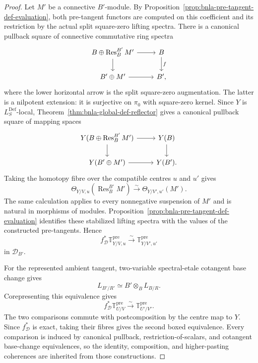 \begin{proof}
Let $M'$ be a connective $B'$-module.  By
Proposition~\ref{prop:bnla-pre-tangent-def-evaluation}, both pre-tangent
functors are computed on this coefficient and its restriction by the actual
split square-zero lifting spectra.  There is a canonical pullback square of
connective commutative ring spectra
\[
\begin{tikzcd}
B\oplus\operatorname{Res}^{B'}_BM'
  \arrow[r] \arrow[d] &
B \arrow[d,"f"]\\
B'\oplus M' \arrow[r] &
B',
\end{tikzcd}
\]
where the lower horizontal arrow is the split square-zero augmentation.  The
latter is a nilpotent extension: it is surjective on $\pi_0$ with square-zero
kernel.  Since $Y$ is $L^{\mathrm{Def}}_S$-local,
Theorem~\ref{thm:bnla-global-def-reflector} gives a canonical pullback square
of mapping spaces
\[
\begin{tikzcd}
Y(B\oplus\operatorname{Res}^{B'}_BM')
  \arrow[r] \arrow[d] &
Y(B) \arrow[d]\\
Y(B'\oplus M') \arrow[r] &
Y(B').
\end{tikzcd}
\]
Taking the homotopy fibre over the compatible centres $u$ and $u'$ gives
\[
\boxed{
    \Theta_{Y/V,u}
    \left(\operatorname{Res}^{B'}_BM'\right)
    \xrightarrow{\sim}
    \Theta_{Y/V',u'}(M').}
\]
The same calculation applies to every nonnegative suspension of $M'$ and
is natural in morphisms of modules.  Proposition~\ref{prop:bnla-pre-tangent-def-evaluation}
identifies these stabilized lifting spectra with the values of the constructed
pre-tangents.  Hence
\[
    f_{\mathcal D}^*
    \mathbb T^{\mathrm{pre}}_{Y/V,u}
    \xrightarrow{\sim}
    \mathbb T^{\mathrm{pre}}_{Y/V',u'}
\]
in $\mathcal D_{B'}$.

For the represented ambient tangent, two-variable spectral-etale cotangent
base change gives
\[
    L_{B'/R'}
    \simeq
    B'\otimes_BL_{B/R}.
\]
Corepresenting this equivalence gives
\[
    f_{\mathcal D}^*
    \mathbb T^{\mathrm{pre}}_{U/V}
    \xrightarrow{\sim}
    \mathbb T^{\mathrm{pre}}_{U'/V'}.
\]
The two comparisons commute with postcomposition by the centre map to $Y$.
Since $f_{\mathcal D}^*$ is exact, taking their fibres gives the second boxed
equivalence.  Every comparison is induced by canonical pullback,
restriction-of-scalars, and cotangent base-change equivalences, so the
identity, composition, and higher-pasting coherences are inherited from those
constructions.
\end{proof}



